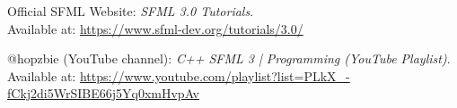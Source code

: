 \begin{thebibliography}{}

    Official SFML Website: \textit{SFML 3.0 Tutorials}.\\ Available at: \url{https://www.sfml-dev.org/tutorials/3.0/}

    @hopzbie (YouTube channel): \textit{C++  SFML 3 | Programming (YouTube Playlist)}. Available at: \url{https://www.youtube.com/playlist?list=PLkX_-fCkj2di5WrSIBE66j5Yq0xmHvpAv}

\end{thebibliography}
